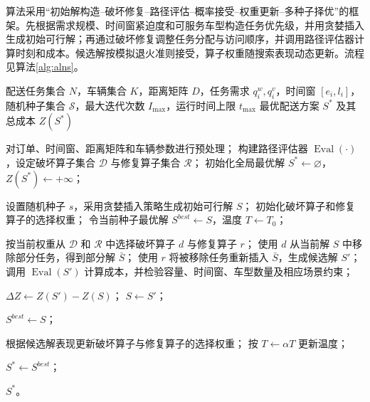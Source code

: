 \documentclass[withoutpreface,bwprint]{cumcmthesis} %
\begin{document}
算法采用“初始解构造--破坏修复--路径评估--概率接受--权重更新--多种子择优”的框架。先根据需求规模、时间窗紧迫度和可服务车型构造任务优先级，并用贪婪插入生成初始可行解；再通过破坏修复调整任务分配与访问顺序，并调用路径评估器计算时刻和成本。候选解按模拟退火准则接受\cite{kirkpatrick1983}，算子权重随搜索表现动态更新。流程见算法\ref{alg:alns}。

\begin{algorithm}[H]
\caption{基于 ALNS 的车辆配送路径优化算法}
\label{alg:alns}
\footnotesize
\begin{algorithmic}[1]
\Require 配送任务集合 $N$，车辆集合 $K$，距离矩阵 $D$，任务需求 $q_i^w,q_i^v$，时间窗 $[e_i,l_i]$，随机种子集合 $\mathcal{S}$，最大迭代次数 $I_{\max}$，运行时间上限 $t_{\max}$
\Ensure 最优配送方案 $S^*$ 及其总成本 $Z(S^*)$

\State 对订单、时间窗、距离矩阵和车辆参数进行预处理；
\State 构建路径评估器 $\operatorname{Eval}(\cdot)$，设定破坏算子集合 $\mathcal{D}$ 与修复算子集合 $\mathcal{R}$；
\State 初始化全局最优解 $S^*\gets \varnothing$，$Z(S^*)\gets +\infty$；

    \State 设置随机种子 $s$，采用贪婪插入策略生成初始可行解 $S$；
    \State 初始化破坏算子和修复算子的选择权重；
    \State 令当前种子最优解 $S^{best}\gets S$，温度 $T\gets T_0$；
    
        \State 按当前权重从 $\mathcal{D}$ 和 $\mathcal{R}$ 中选择破坏算子 $d$ 与修复算子 $r$；
        \State 使用 $d$ 从当前解 $S$ 中移除部分任务，得到部分解 $\bar S$；
        \State 使用 $r$ 将被移除任务重新插入 $\bar S$，生成候选解 $S'$；
        \State 调用 $\operatorname{Eval}(S')$ 计算成本，并检验容量、时间窗、车型数量及相应场景约束；
        
            \State $\Delta Z\gets Z(S')-Z(S)$；
                \State $S\gets S'$；
            \EndIf
            
                \State $S^{best}\gets S$；
            \EndIf
        \EndIf
        
        \State 根据候选解表现更新破坏算子与修复算子的选择权重；
        \State 按 $T\gets \alpha T$ 更新温度；
    \EndFor
    
        \State $S^*\gets S^{best}$；
    \EndIf
\EndFor

\State \Return $S^*$。
\end{algorithmic}
\end{algorithm}
\end{document}
